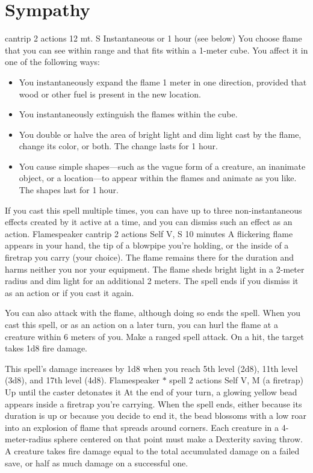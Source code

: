 \section{Sympathy}


    {cantrip}
    {2 actions}
    {12 mt.}
    {S}
    {Instantaneous or 1 hour (see below)}
    You choose flame that you can see within range and that fits within a 1-meter cube.
    You affect it in one of the following ways:
    \begin{itemize}
        \item You instantaneously expand the flame 1 meter in one direction, provided that wood or other fuel is present in the new location.
        \item You instantaneously extinguish the flames within the cube.
        \item You double or halve the area of bright light and dim light cast by the flame, change its color, or both.
        The change lasts for 1 hour.
        \item You cause simple shapes---such as the vague form of a creature, an inanimate object, or a location---to appear within the flames and animate as you like.
        The shapes last for 1 hour.
    \end{itemize}
    If you cast this spell multiple times, you can have up to three non-instantaneous effects created by it active at a time, and you can dismiss such an effect as an action.
    {Flamespeaker cantrip}
    {2 actions}
    {Self}
    {V, S}
    {10 minutes}
    A flickering flame appears in your hand, the tip of a blowpipe you're holding, or the inside of a firetrap you carry (your choice).
    The flame remains there for the duration and harms neither you nor your equipment.
    The flame sheds bright light in a 2-meter radius and dim light for an additional 2 meters.
    The spell ends if you dismiss it as an action or if you cast it again.

    You can also attack with the flame, although doing so ends the spell.
    When you cast this spell, or as an action on a later turn, you can hurl the flame at a creature within 6 meters of you.
    Make a ranged spell attack.
    On a hit, the target takes 1d8 fire damage.

    This spell's damage increases by 1d8 when you reach 5th level (2d8), 11th level (3d8), and 17th level (4d8).
    {Flamespeaker $\ast$ spell}
    {2 actions}
    {Self}
    {V, M (a firetrap)}
    {Up until the caster detonates it}
    At the end of your turn, a glowing yellow bead appears inside a firetrap you're carrying.
    When the spell ends, either because its duration is up or because you decide to end it, the bead blossoms with a low roar into an explosion of flame that spreads around corners.
    Each creature in a 4-meter-radius sphere centered on that point must make a Dexterity saving throw.
    A creature takes fire damage equal to the total accumulated damage on a failed save, or half as much damage on a successful one.

